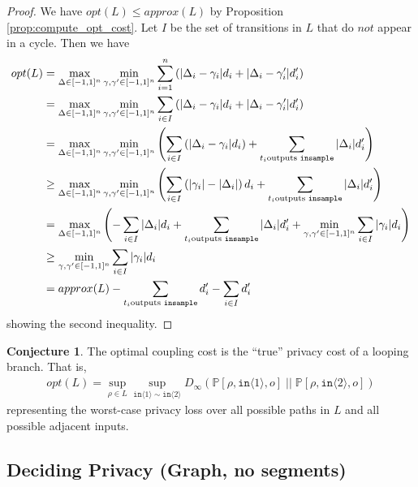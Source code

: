 \documentclass[12pt]{article}
\newcommand{\PP}{\mathbb{P}}
\newcommand{\brangle}[1]{\langle#1 \rangle}
\theoremstyle{definition}
\newtheorem{conj}[thm]{Conjecture}
\begin{document}
\begin{proof}
    We have $opt(L) \leq approx(L)$ by Proposition \ref{prop:compute_opt_cost}. Let $I$ be the set of transitions in $L$ that do $\textit{not}$ appear in a cycle. Then we have
    \begin{align*}
        opt(L) &= \max_{\Delta \in [-1, 1]^n} \min_{\gamma, \gamma' \in [-1, 1]^n} \sum_{i = 1}^n \left(|\Delta_i - \gamma_i| d_i + |\Delta_i - \gamma_i'|d_i' \right)\\
        &= \max_{\Delta \in [-1, 1]^n} \min_{\gamma, \gamma' \in [-1, 1]^n} \sum_{i \in I} \left(|\Delta_i - \gamma_i| d_i + |\Delta_i - \gamma_i'|d_i' \right)\\
        &= \max_{\Delta \in [-1, 1]^n} \min_{\gamma, \gamma' \in [-1, 1]^n} \left(\sum_{i \in I} \left(|\Delta_i - \gamma_i| d_i \right) + \sum_{t_i \text{outputs \texttt{insample}}} |\Delta_i| d_i' \right)\\
        &\geq \max_{\Delta \in [-1, 1]^n} \min_{\gamma, \gamma' \in [-1, 1]^n} \left(\sum_{i \in I} \left(|\gamma_i| - |\Delta_i| \right) d_i  + \sum_{t_i \text{outputs \texttt{insample}}} |\Delta_i| d_i' \right)\\
        &= \max_{\Delta \in [-1, 1]^n} \left(- \sum_{i \in I} |\Delta_i| d_i + \sum_{t_i \text{outputs \texttt{insample}}} |\Delta_i| d_i' + \min_{\gamma, \gamma' \in [-1, 1]^n} \sum_{i \in I}|\gamma_i| d_i \right)\\
        &\geq \min_{\gamma, \gamma' \in [-1, 1]^n} \sum_{i \in I}|\gamma_i| d_i \\
        &= approx(L) - \sum_{t_i \text{outputs \texttt{insample}}} d_i' - \sum_{i \in I} d_i'
    \end{align*}
    showing the second inequality.
\end{proof}


\begin{conj}
    The optimal coupling cost is the ``true'' privacy cost of a looping branch. That is, 
    \begin{align*}
        opt(L) = \sup_{\rho \in L} \sup_{\texttt{in}\brangle{1} \sim \texttt{in}\brangle{2}} D_\infty(\PP[\rho, \texttt{in}\brangle{1}, o]\; ||\; \PP[\rho, \texttt{in}\brangle{2}, o])
    \end{align*}
    representing the worst-case privacy loss over all possible paths in $L$ and all possible adjacent inputs.
\end{conj}

\subsection{Deciding Privacy (Graph, no segments)}
\end{document}
